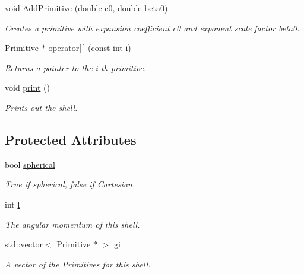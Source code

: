 \begin{DoxyCompactItemize}
void \hyperlink{classJKBuilder_1_1Shell_a20ec923cb07d5d3762fffa4501d09924}{AddPrimitive} (double c0, double beta0)
\begin{DoxyCompactList}\small\item\em Creates a primitive with expansion coefficient c0 and exponent scale factor beta0. \item\end{DoxyCompactList}\item 
\hyperlink{classJKBuilder_1_1Primitive}{Primitive} $\ast$ \hyperlink{classJKBuilder_1_1Shell_ae98a68bcb237e53c8c063aded1b34f2e}{operator\mbox{[}$\,$\mbox{]}} (const int i)
\begin{DoxyCompactList}\small\item\em Returns a pointer to the i-\/th primitive. \item\end{DoxyCompactList}\item 
void \hyperlink{classJKBuilder_1_1Shell_a388f572c62279f839ee138a9afbdeeb5}{print} ()
\begin{DoxyCompactList}\small\item\em Prints out the shell. \item\end{DoxyCompactList}\end{DoxyCompactItemize}
\subsection*{Protected Attributes}
\begin{DoxyCompactItemize}
\item 
bool \hyperlink{classJKBuilder_1_1Shell_a8a5f217a40aac0ce092effdd9b6db9f6}{spherical}
\begin{DoxyCompactList}\small\item\em True if spherical, false if Cartesian. \item\end{DoxyCompactList}\item 
int \hyperlink{classJKBuilder_1_1Shell_a89606eca6b563ec68d2da2e84657736f}{l}
\begin{DoxyCompactList}\small\item\em The angular momentum of this shell. \item\end{DoxyCompactList}\item 
std::vector$<$ \hyperlink{classJKBuilder_1_1Primitive}{Primitive} $\ast$ $>$ \hyperlink{classJKBuilder_1_1Shell_afd0049f3a997082e636f4dae72879da2}{gi}
\begin{DoxyCompactList}\small\item\em A vector of the Primitives for this shell. \item\end{DoxyCompactList}\end{DoxyCompactItemize}
